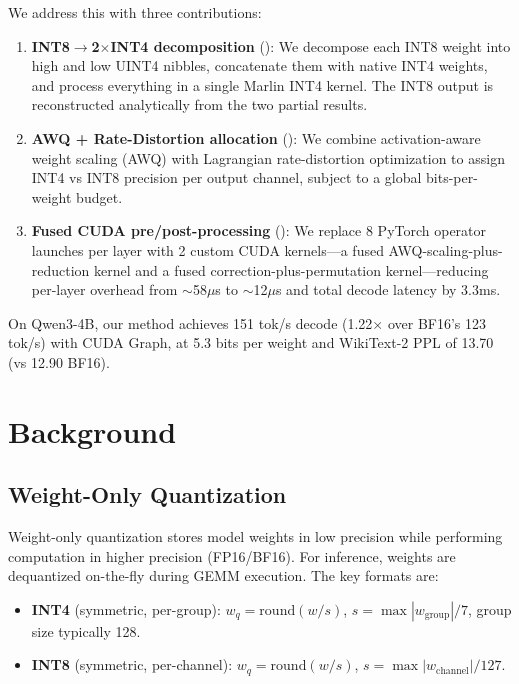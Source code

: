 \documentclass[11pt,a4paper]{article}
\begin{document}
We address this with three contributions:
\begin{enumerate}
    \item \textbf{INT8$\to$2$\times$INT4 decomposition} (): We decompose each INT8 weight into high and low UINT4 nibbles, concatenate them with native INT4 weights, and process everything in a single Marlin INT4 kernel. The INT8 output is reconstructed analytically from the two partial results.

    \item \textbf{AWQ + Rate-Distortion allocation} (): We combine activation-aware weight scaling (AWQ) with Lagrangian rate-distortion optimization to assign INT4 vs INT8 precision per output channel, subject to a global bits-per-weight budget.

    \item \textbf{Fused CUDA pre/post-processing} (): We replace 8 PyTorch operator launches per layer with 2 custom CUDA kernels---a fused AWQ-scaling-plus-reduction kernel and a fused correction-plus-permutation kernel---reducing per-layer overhead from $\sim$58$\mu$s to $\sim$12$\mu$s and total decode latency by 3.3ms.
\end{enumerate}

On Qwen3-4B, our method achieves 151 tok/s decode (1.22$\times$ over BF16's 123 tok/s) with CUDA Graph, at 5.3 bits per weight and WikiText-2 PPL of 13.70 (vs 12.90 BF16).


\section{Background}
\label{sec:background}

\subsection{Weight-Only Quantization}

Weight-only quantization stores model weights in low precision while performing computation in higher precision (FP16/BF16). For inference, weights are dequantized on-the-fly during GEMM execution. The key formats are:
\begin{itemize}
    \item \textbf{INT4} (symmetric, per-group): $w_q = \text{round}(w / s)$, $s = \max|w_{\text{group}}| / 7$, group size typically 128.
    \item \textbf{INT8} (symmetric, per-channel): $w_q = \text{round}(w / s)$, $s = \max|w_{\text{channel}}| / 127$.
\end{itemize}
\end{document}
